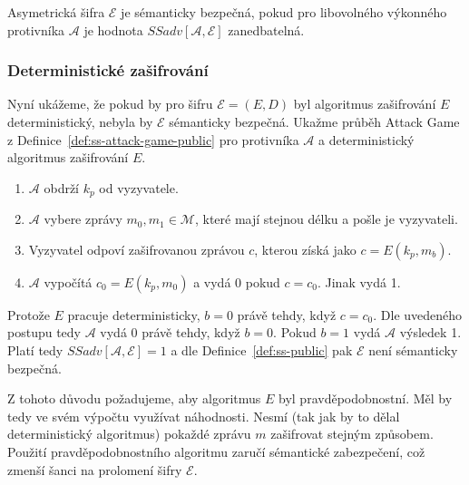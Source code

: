 \documentclass[
  program=infoi,
  biblatex=false,
  figures=true,
  glossaries,
  tables=false,
  sourcecodes=true,
  index
]{kidiplom}
\begin{document}
        \begin{definition}\label{def:ss-public}
            Asymetrická šifra $\mathcal{E}$ je sémanticky bezpečná, pokud pro libovolného výkonného protivníka $\mathcal{A}$
            je hodnota $SSadv[\mathcal{A}, \mathcal{E}]$ zanedbatelná.
        \end{definition}


    \subsubsection{Deterministické zašifrování}\label{ss:deterministic-encryption}
        
        Nyní ukážeme, že pokud by pro šifru $\mathcal{E} = (E, D)$ byl algoritmus zašifrování $E$ deterministický, nebyla by
        $\mathcal{E}$ sémanticky bezpečná.
        Ukažme průběh Attack Game z Definice~\ref{def:ss-attack-game-public} pro protivníka $\mathcal{A}$ a
        deterministický algoritmus zašifrování $E$.

        \begin{enumerate}
            \item
                $\mathcal{A}$ obdrží $k_p$ od vyzyvatele.
            \item 
                $\mathcal{A}$ vybere zprávy $m_0, m_1 \in \mathcal{M}$, které mají stejnou délku a pošle je vyzyvateli.
            \item
                Vyzyvatel odpoví zašifrovanou zprávou $c$, kterou získá jako $c = E(k_p, m_b)$.
            \item
                $\mathcal{A}$ vypočítá $c_0 = E(k_p, m_0)$ a vydá 0 pokud $c = c_0$. Jinak vydá 1.
        \end{enumerate}

        Protože $E$ pracuje deterministicky, $b = 0$ právě tehdy, když $c = c_0$.
        Dle uvedeného postupu tedy $\mathcal{A}$ vydá 0 právě tehdy, když $b = 0$.
        Pokud $b = 1$ vydá $\mathcal{A}$ výsledek 1.
        Platí tedy $SSadv[\mathcal{A}, \mathcal{E}] = 1$ a dle Definice~\ref{def:ss-public} pak $\mathcal{E}$ není sémanticky bezpečná.

        Z tohoto důvodu požadujeme, aby algoritmus $E$ byl pravděpodobnostní.
        Měl by tedy ve svém výpočtu využívat náhodnosti.
        Nesmí (tak jak by to dělal deterministický algoritmus) pokaždé zprávu $m$ zašifrovat stejným způsobem.
        Použití pravděpodobnostního algoritmu zaručí sémantické zabezpečení, což zmenší šanci na prolomení šifry $\mathcal{E}$.
\end{document}
